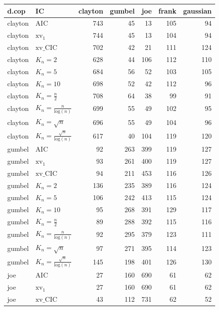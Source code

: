 \begin{table}[htbp]
\centering
\begin{tabular}{llrrrrr}
  \hline
d.cop & IC & clayton & gumbel & joe & frank & gaussian \\ 
  \hline
clayton & AIC & 743 & 45 & 13 & 105 & 94 \\ 
  clayton & $\text{xv}_{1}$ & 744 & 45 & 13 & 104 & 94 \\ 
  clayton & $\text{xv}\_\text{CIC}$ & 702 & 42 & 21 & 111 & 124 \\ 
  clayton & $K_{n}=2$ & 628 & 44 & 106 & 112 & 110 \\ 
  clayton & $K_{n}=5$ & 684 & 56 & 52 & 103 & 105 \\ 
  clayton & $K_{n}=10$ & 698 & 52 & 42 & 112 & 96 \\ 
  clayton & $K_{n}=\tfrac{n}{2}$ & 708 & 64 & 38 & 99 & 91 \\ 
  clayton & $K_{n}=\tfrac{n}{\text{log}(n)}$ & 699 & 55 & 49 & 102 & 95 \\ 
  clayton & $K_{n}=\sqrt{n}$ & 696 & 55 & 49 & 104 & 96 \\ 
  clayton & $K_{n}=\tfrac{\sqrt{n}}{\text{log}(n)}$ & 617 & 40 & 104 & 119 & 120 \\ 
   \hdashline
gumbel & AIC & 92 & 263 & 399 & 119 & 127 \\ 
  gumbel & $\text{xv}_{1}$ & 93 & 261 & 400 & 119 & 127 \\ 
  gumbel & $\text{xv}\_\text{CIC}$ & 94 & 211 & 453 & 116 & 126 \\ 
  gumbel & $K_{n}=2$ & 136 & 235 & 389 & 116 & 124 \\ 
  gumbel & $K_{n}=5$ & 106 & 242 & 413 & 115 & 124 \\ 
  gumbel & $K_{n}=10$ & 95 & 268 & 391 & 129 & 117 \\ 
  gumbel & $K_{n}=\tfrac{n}{2}$ & 89 & 288 & 392 & 115 & 116 \\ 
  gumbel & $K_{n}=\tfrac{n}{\text{log}(n)}$ & 92 & 295 & 379 & 123 & 111 \\ 
  gumbel & $K_{n}=\sqrt{n}$ & 97 & 271 & 395 & 114 & 123 \\ 
  gumbel & $K_{n}=\tfrac{\sqrt{n}}{\text{log}(n)}$ & 145 & 198 & 401 & 126 & 130 \\ 
   \hdashline
joe & AIC & 27 & 160 & 690 & 61 & 62 \\ 
  joe & $\text{xv}_{1}$ & 27 & 160 & 690 & 61 & 62 \\ 
  joe & $\text{xv}\_\text{CIC}$ & 43 & 112 & 731 & 62 & 52 \\ 

\end{tabular}
\end{table}
